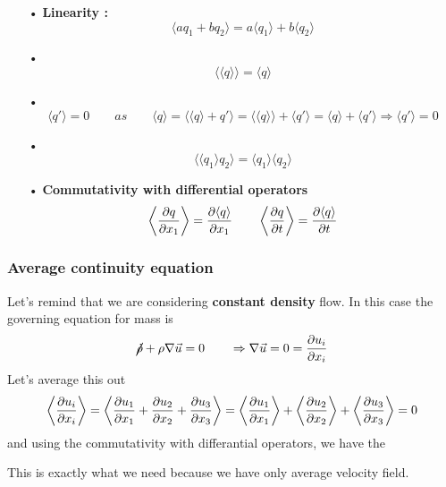 \begin{itemize}
\item[•] \textbf{Linearity :}
\begin{equation}
\langle a q_1 + bq_2\rangle = a \langle q_1\rangle + b  \langle q_2 \rangle 
\end{equation}

\item[•]
\begin{equation}
\langle \langle q\rangle \rangle = \langle q \rangle 
\end{equation}

\item[•]
\begin{equation}
\langle q'\rangle  = 0 \qquad as \qquad \langle q \rangle = \langle \langle q\rangle  + q'\rangle = \langle \langle q \rangle \rangle + \langle q'\rangle  =  \langle q\rangle  + \langle q'\rangle  \Rightarrow \langle q'\rangle  = 0
\end{equation}

\item[•]
\begin{equation}
\langle\langle q_1\rangle q_2\rangle = \langle q_1 \rangle \langle q_2\rangle
\end{equation}

\item[•] \textbf{Commutativity with differential operators}
\begin{equation}
	\left\langle \frac{\partial q}{\partial x_1} \right\rangle = \frac{\partial \langle q \rangle}{\partial x_1} \qquad \left\langle \frac{\partial q}{\partial t} \right\rangle = \frac{\partial \langle q \rangle}{\partial t}
\end{equation}
\end{itemize}

\subsubsection{Average continuity equation}
	Let's remind that we are considering \textbf{constant density} flow. In this case the governing equation for mass is
	\begin{equation}
		\cancel{\dot{\rho}} + \rho \nabla \vec{u} = 0 \qquad \Rightarrow \nabla \vec{u} = 0 = \frac{\partial u_i}{\partial x_i}
	\end{equation}
	Let's average this out 
	\begin{equation}
		\left\langle \frac{\partial u_i}{\partial x_i}  \right\rangle = \left\langle \frac{\partial u_1}{\partial x_1} + \frac{\partial u_2}{\partial x_2} + \frac{\partial u_3}{\partial x_3} \right\rangle = 		\left\langle \frac{\partial u_1}{\partial x_1}  \right\rangle  + \left\langle \frac{\partial u_2}{\partial x_2}  \right\rangle  + 	\left\langle \frac{\partial u_3}{\partial x_3}  \right\rangle  = 0
	\end{equation}
	and using the commutativity with differantial operators, we have the 
	\begin{center}
	\end{center}
	This is exactly what we need because we have only average velocity field. 
	

